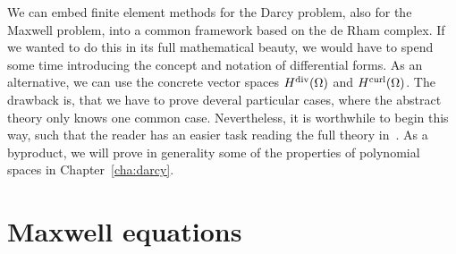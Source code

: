 \begin{intro}
  We can embed finite element methods for the Darcy problem, also for
  the Maxwell problem, into a common framework based on the de Rham
  complex. If we wanted to do this in its full mathematical beauty, we
  would have to spend some time introducing the concept and notation
  of differential forms. As an alternative, we can use the concrete
  vector spaces $H^{\text{div}}(\Omega)$ and $H^{\text{curl}}(\Omega)$. The drawback
  is, that we have to prove deveral particular cases, where the
  abstract theory only knows one common case. Nevertheless, it is
  worthwhile to begin this way, such that the reader has an easier
  task reading the full theory
  in~\cite{ArnoldFalkWinther06acta,ArnoldFalkWinther10}. As a byproduct,
  we will prove in generality some of the properties of polynomial
  spaces in Chapter~\ref{cha:darcy}.
\end{intro}

\section{Maxwell equations}

